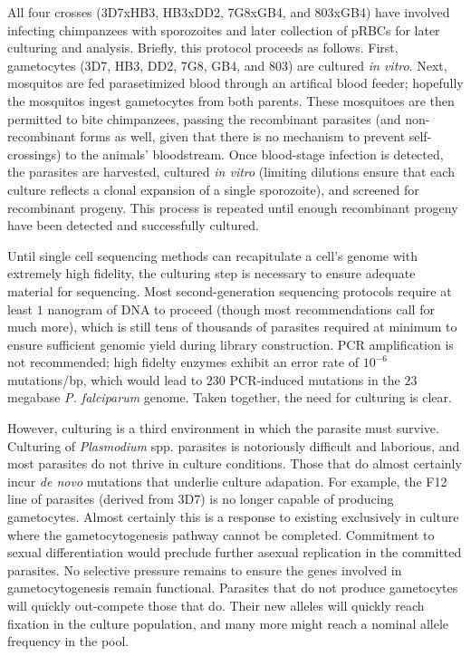 All four crosses (3D7xHB3, HB3xDD2, 7G8xGB4, and 803xGB4) have involved infecting chimpanzees with sporozoites and later collection of pRBCs for later culturing and analysis\cite{RanfordCartwright:2012kp}.  Briefly, this protocol proceeds as follows.  First, gametocytes (3D7, HB3, DD2, 7G8, GB4, and 803) are cultured \textit{in vitro}.  Next, mosquitos are fed parasetimized blood through an artifical blood feeder\cite{Su:2007ipa}; hopefully the mosquitos ingest gametocytes from both parents.  These mosquitoes are then permitted to bite chimpanzees, passing the recombinant parasites (and non-recombinant forms as well, given that there is no mechanism to prevent self-crossings) to the animals' bloodstream.  Once blood-stage infection is detected, the parasites are harvested, cultured \textit{in vitro} (limiting dilutions ensure that each culture reflects a clonal expansion of a single sporozoite), and screened for recombinant progeny.  This process is repeated until enough recombinant progeny have been detected and successfully cultured.

Until single cell sequencing methods can recapitulate a cell's genome with extremely high fidelity, the culturing step is necessary to ensure adequate material for sequencing.  Most second-generation sequencing protocols require at least $1$ nanogram of DNA to proceed (though most recommendations call for much more), which is still tens of thousands of parasites required at minimum to ensure sufficient genomic yield during library construction.  PCR amplification is not recommended; high fidelty enzymes exhibit an error rate of $10^{-6}$ mutations/bp, which would lead to $230$ PCR-induced mutations in the $23$ megabase \textit{P. falciparum} genome.  Taken together, the need for culturing is clear.

However, culturing is a third environment in which the parasite must survive.  Culturing of \textit{Plasmodium} spp. parasites is notoriously difficult and laborious\cite{Schuster:2002ck}, and most parasites do not thrive in culture conditions.  Those that do almost certainly incur \textit{de novo} mutations that underlie culture adapation.  For example, the F12 line of parasites (derived from 3D7) is no longer capable of producing gametocytes\cite{Alano:1995gv,Gissot:2004dv,Silvestrini:2005gc}.  Almost certainly this is a response to existing exclusively in culture where the gametocytogenesis pathway cannot be completed.  Commitment to sexual differentiation would preclude further asexual replication in the committed parasites.  No selective pressure remains to ensure the genes involved in gametocytogenesis remain functional.  Parasites that do not produce gametocytes will quickly out-compete those that do.  Their new alleles will quickly reach fixation in the culture population, and many more might reach a nominal allele frequency in the pool.

